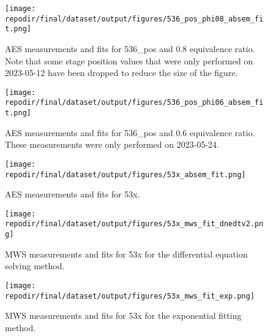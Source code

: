 \begin{figure}[]
\centering
\texttt{[image: \\repodir/final/dataset/output/figures/536\_pos\_phi08\_absem\_fit.png]}
\caption{AES measurements and fits for 536\_pos and 0.8 equivalence ratio. Note that some stage position values that were only performed on 2023-05-12 have been dropped to reduce the size of the figure. }
\label{fig:SI_536_pos_phi08_absem_fit}
\end{figure}

\begin{figure}[]
\centering
\texttt{[image: \\repodir/final/dataset/output/figures/536\_pos\_phi06\_absem\_fit.png]}
\caption{AES measurements and fits for 536\_pos and 0.6 equivalence ratio. These measurements were only performed on 2023-05-24.}
\label{fig:SI_536_pos_phi06_absem_fit}
\end{figure}

\begin{figure}[]
\centering
\texttt{[image: \\repodir/final/dataset/output/figures/53x\_absem\_fit.png]}
\caption{AES measurements and fits for 53x.}
\label{fig:SI_53x_absem_fit}
\end{figure}

\begin{figure}[]
\centering
\texttt{[image: \\repodir/final/dataset/output/figures/53x\_mws\_fit\_dnedtv2.png]}
\caption{MWS measurements and fits for 53x for the differential equation solving method. }
\label{fig:SI_53x_mws_fit_dnedtv2}
\end{figure}

\begin{figure}[]
\centering
\texttt{[image: \\repodir/final/dataset/output/figures/53x\_mws\_fit\_exp.png]}
\caption{MWS measurements and fits for 53x for the exponential fitting method. }
\label{fig:SI_53x_mws_fit_exp}
\end{figure}

